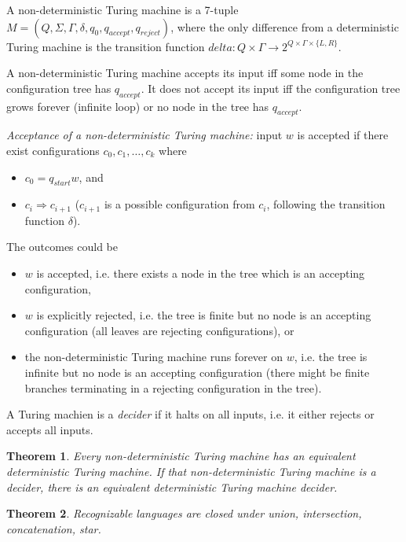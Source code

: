 \documentclass[letterpaper,landscape,11pt]{article}
\newtheorem{theorem}{Theorem}
\begin{document}
A non-deterministic Turing machine is a 7-tuple $M = (Q, \Sigma, \Gamma, \delta, q_0, q_{accept}, q_{reject})$, where the only difference from a deterministic Turing machine is the transition function $delta : Q \times \Gamma \rightarrow 2^{Q \times \Gamma \times \{L, R\}}$.

A non-deterministic Turing machine accepts its input iff some node in the configuration tree has $q_{accept}$. It does not accept its input iff the configuration tree grows forever (infinite loop) or no node in the tree has $q_{accept}$.

\emph{Acceptance of a non-deterministic Turing machine:} input $w$ is accepted if there exist configurations $c_0, c_1, \dots, c_k$ where
\begin{itemize}
	\item $c_0 = q_{start}w$, and
	\item $c_i \Rightarrow c_{i+1}$ ($c_{i+1}$ is a possible configuration from $c_i$, following the transition function $\delta$).
\end{itemize}

The outcomes could be
\begin{itemize}
	\item $w$ is accepted, i.e. there exists a node in the tree which is an accepting configuration,
	\item $w$ is explicitly rejected, i.e. the tree is finite but no node is an accepting configuration (all leaves are rejecting configurations), or
	\item the non-deterministic Turing machine runs forever on $w$, i.e. the tree is infinite but no node is an accepting configuration (there might be finite branches terminating in a rejecting configuration in the tree).
\end{itemize}

A Turing machien is a \emph{decider} if it halts on all inputs, i.e. it either rejects or accepts all inputs.

\begin{theorem}
	Every non-deterministic Turing machine has an equivalent deterministic Turing machine. If that non-deterministic Turing machine is a decider, there is an equivalent deterministic Turing machine decider.
\end{theorem}

\begin{theorem}
	Recognizable languages are closed under union, intersection, concatenation, star.
\end{theorem}
\end{document}
